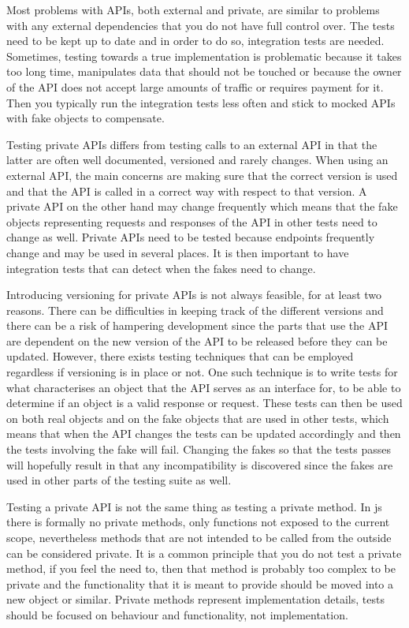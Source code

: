 \documentclass[11pt]{article}
\begin{document}
Most problems with APIs, both external and private, are similar to problems with any external dependencies that you do not have full control over. The tests need to be kept up to date and in order to do so, integration tests are needed. Sometimes, testing towards a true implementation is problematic because it takes too long time, manipulates data that should not be touched or because the owner of the API does not accept large amounts of traffic or requires payment for it. Then you typically run the integration tests less often and stick to mocked APIs with fake objects to compensate. \cite[questions~19-20]{Stenmark}

Testing private APIs differs from testing calls to an external API in that the latter are often well documented, versioned and rarely changes. When using an external API, the main concerns are making sure that the correct version is used and that the API is called in a correct way with respect to that version. A private API on the other hand may change frequently which means that the fake objects representing requests and responses of the API in other tests need to change as well. Private APIs need to be tested because endpoints frequently change and may be used in several places. It is then important to have integration tests that can detect when the fakes need to change. \cite[questions~34,~36]{Edelstam}

Introducing versioning for private APIs is not always feasible, for at least two reasons. There can be difficulties in keeping track of the different versions and there can be a risk of hampering development since the parts that use the API are dependent on the new version of the API to be released before they can be updated. However, there exists testing techniques that can be employed regardless if versioning is in place or not. One such technique is to write tests for what characterises an object that the API serves as an interface for, to be able to determine if an object is a valid response or request. These tests can then be used on both real objects and on the fake objects that are used in other tests, which means that when the API changes the tests can be updated accordingly and then the tests involving the fake will fail. Changing the fakes so that the tests passes will hopefully result in that any incompatibility is discovered since the fakes are used in other parts of the testing suite as well. \cite[question~34]{Edelstam}

Testing a private API is not the same thing as testing a private method. In \gls{js} there is formally no private methods, only functions not exposed to the current scope, nevertheless methods that are not intended to be called from the outside can be considered private. It is a common principle that you do not test a private method, if you feel the need to, then that method is probably too complex to be private and the functionality that it is meant to provide should be moved into a new object or similar. Private methods represent implementation details, tests should be focused on behaviour and functionality, not implementation. \cite[questions~62-63]{Edelstam}
\end{document}
